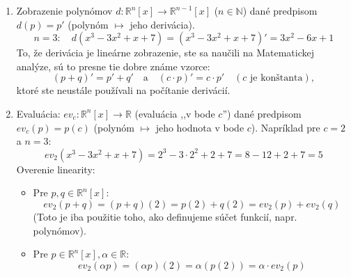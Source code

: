 \begin{priklad}
\begin{enumerate}
\begin{figure}
\begin{center}
\caption{$l_\theta(\vec{v}) + l_\theta(\vec{w})$: najprv rotujeme, potom sčítame}
\end{center}
\end{figure}
    \begin{itemize}
        \item $l_\theta(\vec{v} + \vec{w})$: najprv sčítame, potom rotujeme.
        \item $l_\theta(\vec{v}) + l_\theta(\vec{w})$: najprv rotujeme, potom sčítame.
    \end{itemize}
    V oboch prípadoch dostaneme ten istý vektor (pretože rovnobežník na dolnom obrázku je rotovaný rovnobežník z horného obrázku).
    
    Podobne sa môžeme obrázkom presvedčiť o tom, že $l_\theta(\alpha \vec{v}) = \alpha l_\theta(\vec{v})$.
    
    \item Zobrazenie polynómov $d: \mathbb{R}^n[x] \to \mathbb{R}^{n-1}[x]$ ($n \in \mathbb{N}$) dané predpisom $d(p) = p'$ (polynóm $\mapsto$ jeho derivácia).
    $$ n=3: \quad d(x^3 - 3x^2 + x + 7) = (x^3 - 3x^2 + x + 7)' = 3x^2 - 6x + 1 $$
    To, že derivácia je lineárne zobrazenie, ste sa naučili na Matematickej analýze, sú to presne tie dobre známe vzorce:
    $$ (p+q)' = p' + q' \quad \text{a} \quad (c \cdot p)' = c \cdot p' \quad (c \text{ je konštanta}), $$
    ktoré ste neustále používali na počítanie derivácií.
    
    \item Evaluácia: $ev_c: \mathbb{R}^n[x] \to \mathbb{R}$ (evaluácia ,,v bode $c$'') dané predpisom $ev_c(p) = p(c)$ (polynóm $\mapsto$ jeho hodnota v bode $c$).
    Napríklad pre $c=2$ a $n=3$:
    $$ ev_2(x^3 - 3x^2 + x + 7) = 2^3 - 3\cdot 2^2 + 2 + 7 = 8 - 12 + 2 + 7 = 5 $$
    Overenie linearity:
    \begin{itemize}
        \item Pre $p, q \in \mathbb{R}^n[x]$:
        $$ ev_2(p+q) = (p+q)(2) = p(2) + q(2) = ev_2(p) + ev_2(q) $$
        (Toto je iba použitie toho, ako definujeme súčet funkcií, napr. polynómov).
        \item Pre $p \in \mathbb{R}^n[x], \alpha \in \mathbb{R}$:
        $$ ev_2(\alpha p) = (\alpha p)(2) = \alpha (p(2)) = \alpha \cdot ev_2(p) $$
    \end{itemize}
    

\end{enumerate}
\end{priklad}
